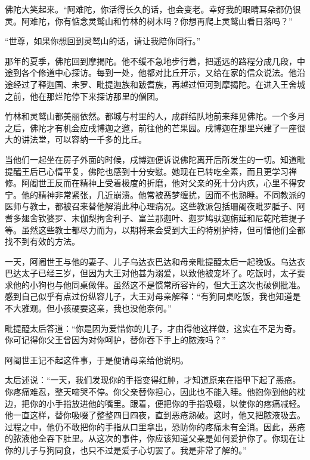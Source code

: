 \documentclass[12pt,twoside,openany]{book}
\begin{document}
佛陀大笑起来。“阿难陀，你活得长久的话，也会变老。幸好我的眼睛耳朵都仍很灵。阿难陀，你有惦念灵鹫山和竹林的树木吗？你想再爬上灵鹫山看日落吗？”

“世尊，如果你想回到灵鹫山的话，请让我陪你同行。”

那年的夏季，佛陀回到摩揭陀。他不缓不急地步行着，把遥远的路程分成几段，中途到各个修道中心探访。每到一处，他都对比丘开示，又给在家的信众说法。他沿途经过了释迦国、未罗、毗提迦族和跋耆族，再越过恒河到摩揭陀。在进入王舍城之前，他在那烂陀停下来探访那里的僧团。

竹林和灵鹫山都美丽依然。都城与村里的人，成群结队地前来拜见佛陀。一个多月之后，佛陀才有机会应戌博迦之邀，前往他的芒果园。戌博迦在那里兴建了一座很大的讲法堂，可以容纳一千多的比丘。

当他们一起坐在房子外面的时候，戌博迦便诉说佛陀离开后所发生的一切。知道毗提醯王后已心情平复，佛陀也感到十分安慰。她现在已转吃全素，而且更学习禅修。阿阇世王反而在精神上受着极度的折磨，他对父亲的死十分内疚，心里不得安宁。他的精神非常紧张，几近崩溃。他常被恶梦缠扰，因而不也熟睡。不同教派的医师与教士，都被召来替他解消此种心理病况。这些教派包括珊阇夜\textperiodcentered 毗罗胝子、阿耆多\textperiodcentered 翅舍钦婆罗、末伽梨\textperiodcentered 拘舍利子、富兰那\textperiodcentered 迦叶、迦罗鸠驮\textperiodcentered 迦旃延和尼乾陀\textperiodcentered 若提子等。虽然这些教士都尽力而为，以期将来会受到大王的特别护持，但可惜他们全都找不到有效的方法。

一天，阿阇世王与他的妻子、儿子乌达衣巴达和母亲毗提醯太后一起晚饭。乌达衣巴达太子已经三岁，但因为大王对他甚为溺爱，以致他被宠坏了。吃饭时，太子要求他的小狗也与他同桌做伴。虽然这不是惯常所容许的，但大王这次也破例批准。感到自己似乎有点过份纵容儿子，大王对母亲解释：“有狗同桌吃饭，我也知道是不大雅观。但小孩硬要这亲，我也没他奈何。”

毗提醯太后答道：“你是因为爱惜你的儿子，才由得他这样做，这实在不足为奇。你可记得你父王曾因为对你呵护，替你吞下手上的脓液吗？”

阿阇世王记不起这件事，于是便请母亲给他说明。

太后述说：“一天，我们发现你的手指变得红肿，才知道原来在指甲下起了恶疮。你疼痛难忍，整天啼哭不停。你父亲替你担心，因此也不能入睡。他抱你到他的枕边，把你的小手指放进他的嘴里。跟着，便把你的手指吸啜，以使你的疼痛减轻。他一直这样，替你吸啜了整整四日四夜，直到恶疮熟破。这时，他又把脓液吸去。过程之中，他仍不敢把你的手指从口里拿出，恐防你的疼痛未有全消。因此，恶疮的脓液他全吞下肚里。从这次的事件，你应该知道父亲是如何爱护你了。你现在让你的儿子与狗同食，也只不过是爱子心切罢了。我是非常了解的。”
\end{document}
